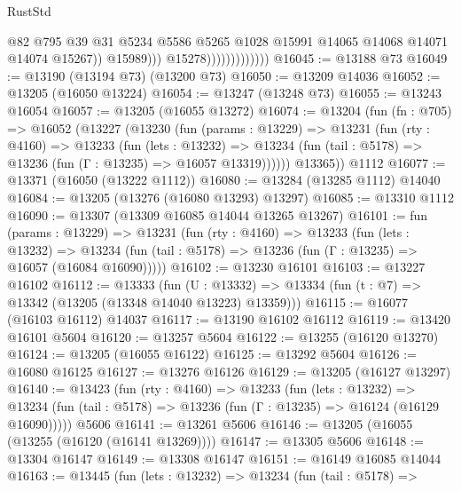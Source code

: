 \begin{lexlean}{RustStd}
\begin{coremodule}
                                        @82
                                        @795
                                        @39
                                        @31
                                        @5234
                                        @5586
                                        @5265
                                        @1028
                                        @15991
                                        @14065
                                        @14068
                                        @14071
                                        @14074
                                        @15267))
                                    @15989)))
                              @15278)))))))))))))
@16045 := @13188 @73
@16049 := @13190 (@13194 @73) (@13200 @73)
@16050 := @13209 @14036
@16052 := @13205 (@16050 @13224)
@16054 := @13247 (@13248 @73)
@16055 := @13243 @16054
@16057 := @13205 (@16055 @13272)
@16074 := @13204
    (fun (fn : @705) =>
    @16052
      (@13227
        (@13230
          (fun (params : @13229) =>
          @13231
            (fun (rty : @4160) =>
            @13233
              (fun (lets : @13232) =>
              @13234 (fun (tail : @5178) => @13236 (fun (Γ : @13235) => @16057 @13319))))))
        @13365))
    @1112
@16077 := @13371 (@16050 (@13222 @1112))
@16080 := @13284 (@13285 @1112) @14040
@16084 := @13205 (@13276 (@16080 @13293) @13297)
@16085 := @13310 @1112
@16090 := @13307 (@13309 @16085 @14044 @13265 @13267)
@16101 := fun (params : @13229) =>
  @13231
    (fun (rty : @4160) =>
    @13233
      (fun (lets : @13232) =>
      @13234 (fun (tail : @5178) => @13236 (fun (Γ : @13235) => @16057 (@16084 @16090)))))
@16102 := @13230 @16101
@16103 := @13227 @16102
@16112 := @13333
    (fun (U : @13332) => @13334 (fun (t : @7) => @13342 (@13205 (@13348 @14040 @13223) @13359)))
@16115 := @16077 (@16103 @16112) @14037
@16117 := @13190 @16102 @16112
@16119 := @13420 @16101 @5604
@16120 := @13257 @5604
@16122 := @13255 (@16120 @13270)
@16124 := @13205 (@16055 @16122)
@16125 := @13292 @5604
@16126 := @16080 @16125
@16127 := @13276 @16126
@16129 := @13205 (@16127 @13297)
@16140 := @13423
    (fun (rty : @4160) =>
    @13233
      (fun (lets : @13232) =>
      @13234 (fun (tail : @5178) => @13236 (fun (Γ : @13235) => @16124 (@16129 @16090)))))
    @5606
@16141 := @13261 @5606
@16146 := @13205 (@16055 (@13255 (@16120 (@16141 @13269))))
@16147 := @13305 @5606
@16148 := @13304 @16147
@16149 := @13308 @16147
@16151 := @16149 @16085 @14044
@16163 := @13445
    (fun (lets : @13232) =>
    @13234
      (fun (tail : @5178) =>

\end{coremodule}
\end{lexlean}
